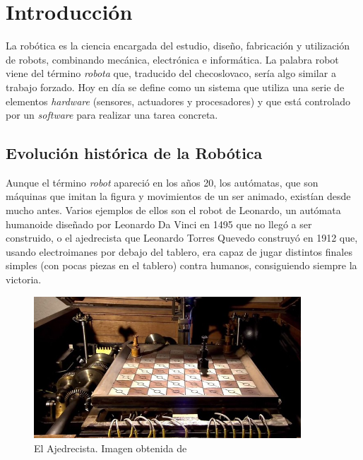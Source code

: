 \chapter{Introducción}
\label{cap:capitulo1}
\setcounter{page}{1}

La robótica es la ciencia encargada del estudio, diseño, fabricación y utilización de robots, combinando mecánica, electrónica e informática.
La palabra robot viene del término \textit{robota} que, traducido del checoslovaco, sería algo similar a trabajo forzado. Hoy en día se define como un
sistema que utiliza una serie de elementos \textit{hardware} (sensores, actuadores y procesadores) y que está controlado por un \textit{software}
para realizar una tarea concreta.

\section{Evolución histórica de la Robótica}
\label{sec:robotica}

Aunque el término \textit{robot} apareció en los años 20, los autómatas, que son máquinas que imitan la figura y movimientos de un ser animado, existían desde mucho antes.
Varios ejemplos de ellos son el robot de Leonardo, un autómata humanoide diseñado por Leonardo Da Vinci en 1495 que no llegó a ser construido, o el ajedrecista
que Leonardo Torres Quevedo construyó en 1912 que, usando electroimanes por debajo del tablero, era capaz de jugar distintos finales
simples (con pocas piezas en el tablero) contra humanos, consiguiendo siempre la victoria.\\

\begin{figure} [H]
  \begin{center}
      \includegraphics[width=10cm]{figs/c1/ajedrecista.jpg}
  \end{center}
  \caption[El Ajedrecista]{El Ajedrecista. Imagen obtenida de \cite{ajedrecista}}
  \label{fig:ajedrecista}
\end{figure}


